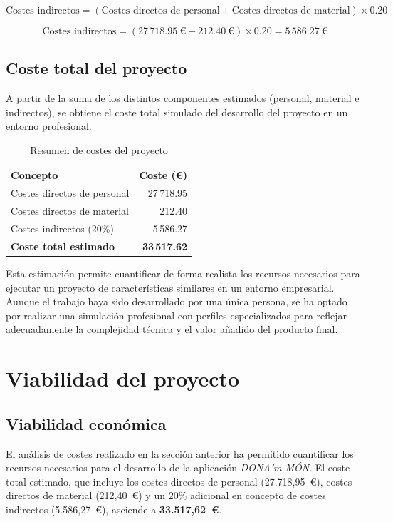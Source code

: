 \[
\text{Costes indirectos} = (\text{Costes directos de personal} + \text{Costes directos de material}) \times 0.20
\]

\[
\text{Costes indirectos} = (27\,718.95\ € + 212.40\ €) \times 0.20 = 5\,586.27\ €
\]

\subsection{Coste total del proyecto}

A partir de la suma de los distintos componentes estimados (personal, material e indirectos), se obtiene el coste total simulado del desarrollo del proyecto en un entorno profesional.

\begin{table}[H]
\centering
\caption{Resumen de costes del proyecto}
\begin{tabular}{|l|r|}
\hline
\textbf{Concepto} & \textbf{Coste (€)} \\
\hline
Costes directos de personal & 27\,718.95 \\
Costes directos de material & 212.40 \\
Costes indirectos (20\%) & 5\,586.27 \\
\hline
\textbf{Coste total estimado} & \textbf{33\,517.62} \\
\hline
\end{tabular}
\end{table}

Esta estimación permite cuantificar de forma realista los recursos necesarios para ejecutar un proyecto de características similares en un entorno empresarial. Aunque el trabajo haya sido desarrollado por una única persona, se ha optado por realizar una simulación profesional con perfiles especializados para reflejar adecuadamente la complejidad técnica y el valor añadido del producto final.

\section{Viabilidad del proyecto}

\subsection{Viabilidad económica}

El análisis de costes realizado en la sección anterior ha permitido cuantificar los recursos necesarios para el desarrollo de la aplicación \textit{DONA’m MÓN}. El coste total estimado, que incluye los costes directos de personal (27.718,95~€), costes directos de material (212,40~€) y un 20\% adicional en concepto de costes indirectos (5.586,27~€), asciende a \textbf{33.517,62~€}.

